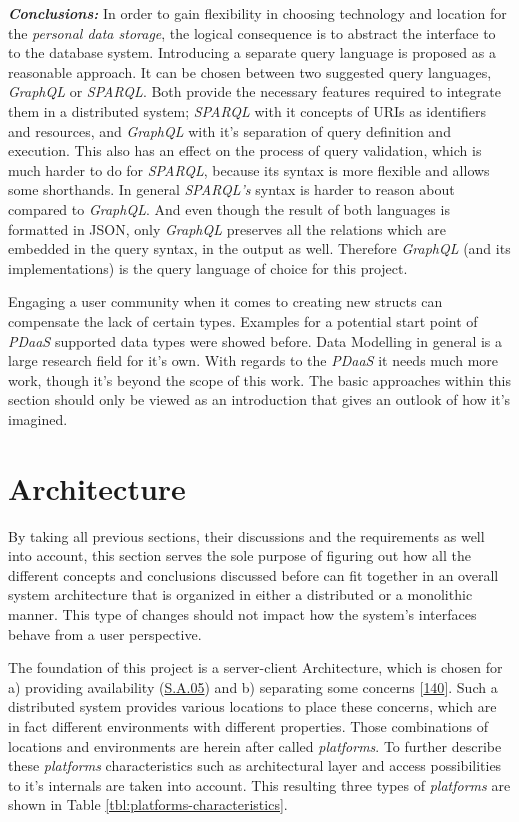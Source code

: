 \documentclass[12pt,english,a4paper,titlepage,cleardoublepage=empty,dottedtoc]{report}
\begin{document}
\emph{\textbf{Conclusions:}} In order to gain flexibility in choosing
technology and location for the \emph{personal data storage}, the
logical consequence is to abstract the interface to to the database
system. Introducing a separate query language is proposed as a
reasonable approach. It can be chosen between two suggested query
languages, \emph{GraphQL} or \emph{SPARQL}. Both provide the necessary
features required to integrate them in a distributed system;
\emph{SPARQL} with it concepts of URIs as identifiers and resources, and
\emph{GraphQL} with it's separation of query definition and execution.
This also has an effect on the process of query validation, which is
much harder to do for \emph{SPARQL}, because its syntax is more flexible
and allows some shorthands. In general \emph{SPARQL's} syntax is harder
to reason about compared to \emph{GraphQL}. And even though the result
of both languages is formatted in JSON, only \emph{GraphQL} preserves
all the relations which are embedded in the query syntax, in the output
as well. Therefore \emph{GraphQL} (and its implementations) is the query
language of choice for this project.

Engaging a user community when it comes to creating new structs can
compensate the lack of certain types. Examples for a potential start
point of \emph{PDaaS} supported data types were showed before. Data
Modelling in general is a large research field for it's own. With
regards to the \emph{PDaaS} it needs much more work, though it's beyond
the scope of this work. The basic approaches within this section should
only be viewed as an introduction that gives an outlook of how it's
imagined.

\section{Architecture}\label{architecture}

By taking all previous sections, their discussions and the requirements
as well into account, this section serves the sole purpose of figuring
out how all the different concepts and conclusions discussed before can
fit together in an overall system architecture that is organized in
either a distributed or a monolithic manner. This type of changes should
not impact how the system's interfaces behave from a user perspective.

The foundation of this project is a server-client Architecture, which is
chosen for a) providing availability (\protect\hyperlink{sa05}{S.A.05})
and b) separating some concerns
{[}\protect\hyperlink{ref-web_2016_wikipedia_separation-of-concerns}{140}{]}.
Such a distributed system provides various locations to place these
concerns, which are in fact different environments with different
properties. Those combinations of locations and environments are herein
after called \emph{platforms}. To further describe these
\emph{platforms} characteristics such as architectural layer and access
possibilities to it's internals are taken into account. This resulting
three types of \emph{platforms} are shown in Table
\ref{tbl:platforms-characteristics}.
\end{document}
